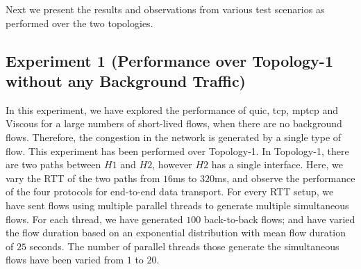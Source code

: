 Next we present the results and observations from various test scenarios as performed over the two topologies. 

\subsection{Experiment 1 (Performance over Topology-1 without any Background Traffic)}
\label{sub:experiment1}
In this experiment, we have explored the performance of \acrshort{quic}, \acrshort{tcp}, \acrshort{mptcp} and Viscous for a large numbers of short-lived flows, when there are no background flows. Therefore, the congestion in the network is generated by a single type of flow. This experiment has been performed over Topology-1. In Topology-1, there are two paths between $H1$ and $H2$, however $H2$ has a single interface. Here, we vary the RTT of the two paths from $16$ms to $320$ms, and observe the performance of the four protocols for end-to-end data transport. For every RTT setup, we have sent flows using multiple parallel threads to generate multiple simultaneous flows. For each thread, we have generated $100$ back-to-back flows; and have varied the flow duration based on an exponential distribution with mean flow duration of $25$ seconds. The number of parallel threads those generate the simultaneous flows have been varied from $1$ to $20$.  
%

